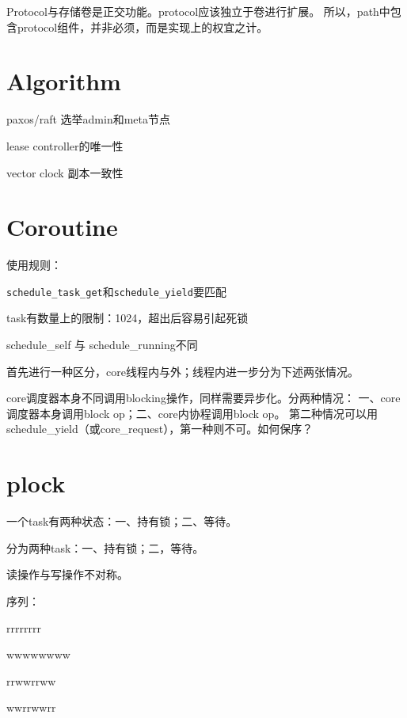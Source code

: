 Protocol与存储卷是正交功能。protocol应该独立于卷进行扩展。
所以，path中包含protocol组件，并非必须，而是实现上的权宜之计。

\section{Algorithm}

\begin{compactitem}
\item paxos/raft 选举admin和meta节点
\item lease controller的唯一性
\item vector clock 副本一致性
\end{compactitem}

\section{Coroutine}

使用规则：
\begin{compactitem}
    \item \verb|schedule_task_get|和\verb|schedule_yield|要匹配
    \item task有数量上的限制：1024，超出后容易引起死锁
    \item schedule\_self 与 schedule\_running不同
\end{compactitem}

首先进行一种区分，core线程内与外；线程内进一步分为下述两张情况。

core调度器本身不同调用blocking操作，同样需要异步化。分两种情况：
一、core调度器本身调用block op；二、core内协程调用block op。
第二种情况可以用schedule\_yield（或core\_request），第一种则不可。如何保序？

\section{plock}

一个task有两种状态：一、持有锁；二、等待。

分为两种task：一、持有锁；二，等待。

读操作与写操作不对称。

序列：
\begin{enumbox}
\item rrrrrrrr
\item wwwwwwww
\item rrwwrrww
\item wwrrwwrr
\end{enumbox}

